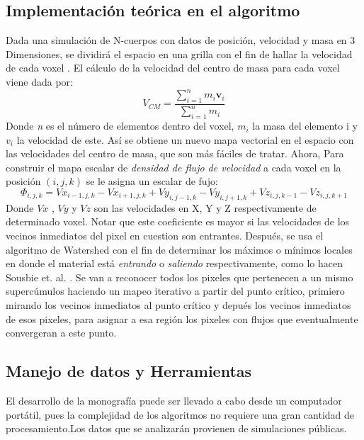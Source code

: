 \documentclass[12pt]{article}
\begin{document}
\subsection{Implementación teórica en el algoritmo}
Dada una simulación de N-cuerpos con datos de posición, velocidad y masa en 3 Dimensiones, se dividirá el espacio en una grilla con el fin de hallar la velocidad de cada voxel . El cálculo de la velocidad del centro de masa para cada voxel viene dada por:
\begin{equation}
V_{CM}=\frac{\sum_{i=1}^n m_i \textbf{v}_i}{\sum_{i=1}^n m_i} 
\end{equation}
Donde \textit{n} es el número de elementos dentro del voxel, $m_i$ la masa del elemento i y $v_i$ la velocidad de este.
Así se obtiene un nuevo mapa vectorial en el espacio con las velocidades del centro de masa, que son más fáciles de tratar. Ahora, Para construir el mapa escalar de \textit{densidad de flujo de velocidad} a cada voxel en la posición $(i,j,k)$ se le asigna un escalar de fujo:
\begin{equation}
\Phi_{i,j,k}=Vx_{i-1,j,k}-Vx_{i+1,j,k}+Vy_{i,j-1,k}-Vy_{i,j+1,k}+Vz_{i,j,k-1}-Vz_{i,j,k+1}
\end{equation}
Donde $Vx$ , $Vy$ y $Vz$ son las velocidades en X, Y y Z respectivamente de determinado voxel. Notar que este coeficiente  es mayor si las velocidades de los vecinos inmediatos del pixel en cuestion son entrantes. Después, se usa el algoritmo de Watershed \cite{WaterBeuch} \cite{SegmBeuch} con el fin de determinar los máximos o mínimos locales en donde el material está \textit{entrando} o \textit{saliendo} respectivamente, como lo hacen Sousbie et. al. \cite{FullyConn}. Se van a reconocer todos los pixeles que pertenecen a un mismo supercúmulos haciendo un mapeo iterativo a partir del punto crítico, primiero mirando los vecinos inmediatos al punto crítico y depués los vecinos inmediatos de esos pixeles, para asignar a esa región los pixeles con flujos que eventualmente convergeran a este punto.


\subsection{Manejo de datos y Herramientas}

El desarrollo de la monografía puede ser llevado a cabo desde un computador portátil, pues la complejidad de los algoritmos no requiere una gran cantidad de procesamiento.Los datos que se analizarán provienen de simulaciones públicas\cite{simulations}.
\end{document}
